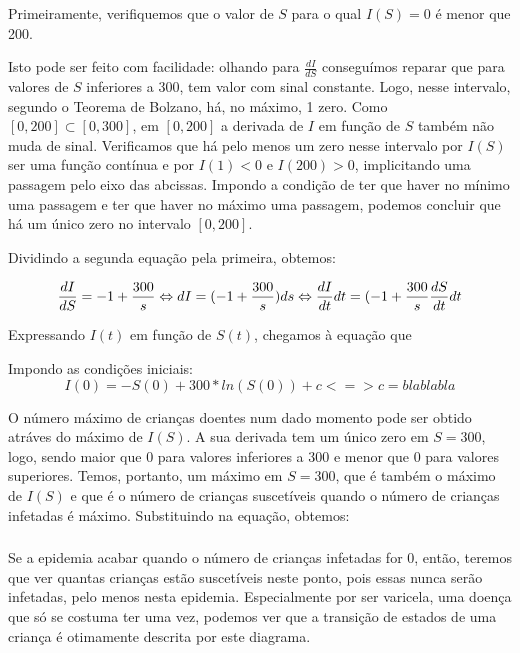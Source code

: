 \documentclass[portuguese, a4paper]{article}
\begin{document}
		\subsubsection{}
		\par %
		Primeiramente, verifiquemos que o valor de $S$ para o qual $I(S) = 0$ é menor que 200.
		\par
		Isto pode ser feito com facilidade: olhando para $\frac{dI}{dS}$ conseguímos reparar que para valores
		de $S$ inferiores a 300, tem valor com sinal constante. Logo, nesse intervalo, segundo o Teorema de Bolzano,
		há, no máximo, 1 zero. Como $[0, 200] \subset [0, 300]$, em $[0, 200]$ a derivada de $I$ em função de $S$ também não muda de sinal.
		Verificamos que há pelo menos um zero nesse intervalo por $I(S)$ ser uma função contínua e por $I(1) < 0$ e $I(200) > 0$,
		implicitando uma passagem pelo eixo das abcissas. Impondo a condição de ter que haver no mínimo uma passagem e ter que haver no máximo uma passagem,
		podemos concluir que há um único zero no intervalo $[0, 200]$.
		\par
		Dividindo a segunda equação pela primeira, obtemos:

		\begin{equation} \label{di}
			\frac{dI}{dS} = -1 + \frac{300}{s} \Leftrightarrow \\
			dI = ( -1 + \frac{300}{s})ds \Leftrightarrow \\
			\frac{dI}{dt} dt = (-1 + \frac{300}{s} \frac{dS}{dt} dt
		\end{equation}


		Expressando $I(t)$ em função de $S(t)$, chegamos à equação que

		Impondo as condições iniciais:
		$$I(0) = -S(0) + 300* ln(S(0)) + c <=> c = bla bla bla$$


		O número máximo de crianças doentes num dado momento pode ser obtido
		atráves do máximo de $I(S)$. A sua derivada tem um único zero em $S = 300$,
		logo, sendo maior que 0 para valores inferiores a 300 e menor que 0 para valores superiores.
		Temos, portanto, um máximo em $S = 300$, que é também o máximo de $I(S)$ e que é
		o número de crianças suscetíveis quando o número de crianças infetadas é máximo.
		Substituindo na equação, obtemos:

		\subsubsection{}
		\par
		Se a epidemia acabar quando o número de crianças infetadas for 0, então, teremos
		que ver quantas crianças estão suscetíveis neste ponto, pois essas nunca serão infetadas, pelo menos nesta
		epidemia. Especialmente por ser varicela, uma doença que só se costuma ter uma vez,
		podemos ver que a transição de estados de uma criança
		é otimamente descrita por este diagrama.
\end{document}

